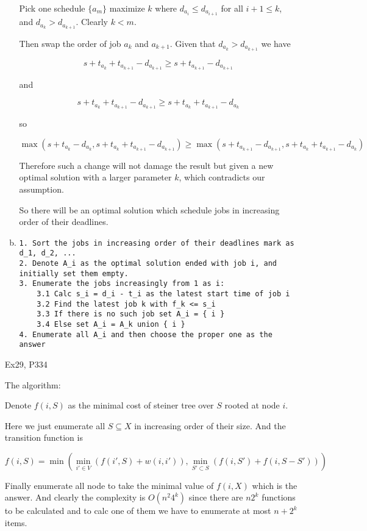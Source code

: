 \documentclass{article}
\begin{document}
\begin{itemize}
\begin{enumerate}[(a)]
                Pick one schedule $\{a_m\}$ maximize $k$ where
                $d_{a_i} \le d_{a_{i + 1}}$ for all $i + 1 \le k$,
                and $d_{a_k} > d_{a_{k + 1}}$.
                Clearly $k < m$.

                Then swap the order of job $a_k$ and $a_{k + 1}$.
                Given that $d_{a_k} > d_{a_{k + 1}}$ we have

                $$s + t_{a_k} + t_{a_{k + 1}} - d_{a_{k + 1}} \ge s + t_{a_{k+1}} - d_{a_{k + 1}}$$

                and 

                $$s + t_{a_k} + t_{a_{k + 1}} - d_{a_{k + 1}} \ge s + t_{a_k} + t_{a_{k + 1}} - d_{a_k}$$

                so

                $$\max(s + t_{a_k} - d_{a_k}, s + t_{a_k} + t_{a_{k + 1}} - d_{a_{k + 1}})
                \ge \max(s + t_{a_{k+1}} - d_{a_{k + 1}}, s + t_{a_k} + t_{a_{k + 1}} - d_{a_k})$$

                Therefore such a change will not damage the result but given a new
                optimal solution with a larger parameter $k$, which contradicts our
                assumption.

                So there will be an optimal solution which schedule jobs in increasing
                order of their deadlines.

            \item
\begin{verbatim}
1. Sort the jobs in increasing order of their deadlines mark as d_1, d_2, ...
2. Denote A_i as the optimal solution ended with job i, and initially set them empty.
3. Enumerate the jobs increasingly from 1 as i:
    3.1 Calc s_i = d_i - t_i as the latest start time of job i
    3.2 Find the latest job k with f_k <= s_i
    3.3 If there is no such job set A_i = { i }
    3.4 Else set A_i = A_k union { i }
4. Enumerate all A_i and then choose the proper one as the answer
\end{verbatim}

        \end{enumerate}


    \item[Ex29, P334]

        The algorithm:
        
        Denote $f(i, S)$ as the minimal cost of steiner tree over $S$ rooted at node $i$.

        Here we just enumerate all $S \subseteq X$ in increasing order of their size.
        And the transition function is 

        $$f(i, S) = \min(\min_{i' \in V}(f(i', S) + w(i, i')), \min_{S' \subset S}(f(i, S') + f(i, S - S')))$$

        Finally enumerate all node to take the minimal value of $f(i, X)$ which is the answer.
        And clearly the complexity is $O(n^2 4^k)$ since there are $n 2^k$ functions to be
        calculated and to calc one of them we have to enumerate at most $n + 2^k$ items.

\end{itemize}
\end{document}
